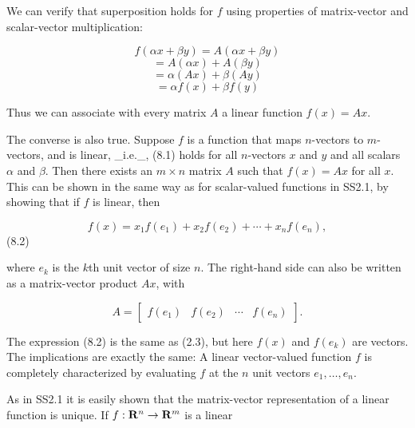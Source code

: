 We can verify that superposition holds for \(f\) using properties of matrix-vector and scalar-vector multiplication:

\[f(\alpha x+\beta y) = A(\alpha x+\beta y)\] \[= A(\alpha x)+A(\beta y)\] \[= \alpha(Ax)+\beta(Ay)\] \[= \alpha f(x)+\beta f(y)\]

Thus we can associate with every matrix \(A\) a linear function \(f(x)=Ax\).

The converse is also true. Suppose \(f\) is a function that maps \(n\)-vectors to \(m\)-vectors, and is linear, _i.e._, (8.1) holds for all \(n\)-vectors \(x\) and \(y\) and all scalars \(\alpha\) and \(\beta\). Then there exists an \(m\times n\) matrix \(A\) such that \(f(x)=Ax\) for all \(x\). This can be shown in the same way as for scalar-valued functions in SS2.1, by showing that if \(f\) is linear, then

\[f(x)=x_{1}f(e_{1})+x_{2}f(e_{2})+\cdots+x_{n}f(e_{n}),\] (8.2)

where \(e_{k}\) is the \(k\)th unit vector of size \(n\). The right-hand side can also be written as a matrix-vector product \(Ax\), with

\[A=\left[\begin{array}{cccc}f(e_{1})&f(e_{2})&\cdots&f(e_{n})\end{array} \right].\]

The expression (8.2) is the same as (2.3), but here \(f(x)\) and \(f(e_{k})\) are vectors. The implications are exactly the same: A linear vector-valued function \(f\) is completely characterized by evaluating \(f\) at the \(n\) unit vectors \(e_{1},\ldots,e_{n}\).

As in SS2.1 it is easily shown that the matrix-vector representation of a linear function is unique. If \(f:{\bf R}^{n}\to{\bf R}^{m}\) is a linear 
